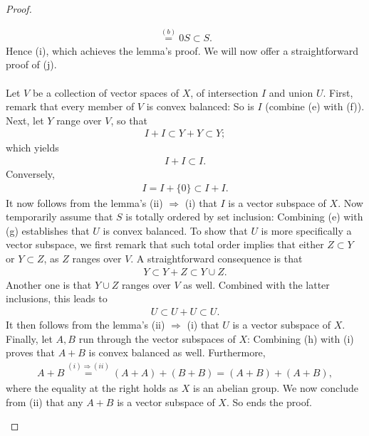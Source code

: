 \begin{proof}
\begin{enumerate}
\begin{align}
  \overset{(b)}{=} 0S \subset S.
\end{align}
%
Hence (i), which achieves the lemma's proof. %
We will now offer a straightforward proof of (j). \\
\\
Let $V$ be a collection of vector spaces of $X$, %
of intersection $I$ and union $U$. 
%
First, remark that every member of $V$ is convex balanced: %
So is $I$ (combine (e) with (f)). %
%
Next, let $\mathit{Y}$ range over $V$, so that %
%
\begin{align}
  I + I \subset Y + Y \subset  Y; 
\end{align}
%
which yields
%
\begin{align}
  I + I \subset I. 
\end{align}
%
Conversely, 
\begin{align}
  I  = I + \{0\} \subset I + I.
\end{align}
%
It now follows from the lemma's (ii) $\Rightarrow$ (i) that %
$I$ is a vector subspace of $X$. %
%
Now temporarily assume that $S$ is totally ordered by set inclusion: %
Combining (e) with (g) establishes that $U$ is convex balanced. %
%
To show that $U$ is more specifically a vector subspace, %
we first remark that such total order implies that either %
$Z \subset Y$ or $Y \subset Z$, as $\mathit{Z}$ ranges over $V$. %
A straightforward consequence is that 
%
\begin{align}
  Y \subset Y + Z  \subset Y\cup Z.
\end{align}
%
Another one is that $Y \cup Z$ ranges over $V$ as well. %
Combined with the latter inclusions, this leads to %
%
\begin{align}
  U \subset U  + U \subset U.
\end{align}
%
It then follows from the lemma's (ii) $\Rightarrow$ (i) that %
$U$ is a vector subspace of $X$. %
%
Finally, let $\mathit{A},\mathit{B}$ run through the vector subspaces of $X$: %
Combining (h) with (i) proves that $A+B$ is convex balanced as well. %
%
Furthermore, %
%
\begin{align}
  A + B \overset{(i) \Rightarrow (ii)}{=} (A + A) + (B + B) = (A + B) + (A + B),
\end{align}
% 
where the equality at the right holds as $X$ is an abelian group. %
We now conclude from (ii) that any $A+B$ is a vector subspace of $X$. %
%
So ends the proof. %
\end{enumerate}
\end{proof}